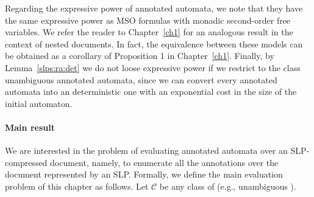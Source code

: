 \newcommand{\blabla}{Proposition 1 }

Regarding the expressive power of annotated automata, we note that they have the same expressive power as MSO formulas with monadic second-order free variables. We refer the reader to Chapter~\ref{ch1} for an analogous result in the context of nested documents. In fact, the equivalence between these models can be obtained as a corollary of \blabla in Chapter~\ref{ch1}.
Finally, by Lemma~\ref{slps:ra:det} we do not loose expressive power if we restrict to the class unambiguous annotated automata, since we can convert every annotated automata into an deterministic one with an exponential cost in the size of the initial automaton. 

\paragraph{Main result} 
We are interested in the problem of evaluating annotated automata over an SLP-compressed document, namely, to enumerate all the annotations over the document represented by an SLP. Formally, we define the main evaluation problem of this chapter as follows. Let $\mathcal{C}$ be any class of \rt (e.g., unambiguous \rt). 

\vspace{0.5em}

\begin{center}
\end{center}

\vspace{0.5em}


